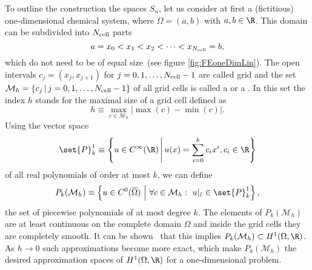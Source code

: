To outline the construction the spaces $S_n$,
let us consider at first a (fictitious) one-dimensional chemical system,
where $\Omega = (a,b)$ with $a,b \in \R$.
This domain can be subdivided into $N_\text{cell}$ parts
\[ a = x_0 < x_1 < x_2 < \cdots < x_{N_\text{cell}} = b, \]
which do not need to be of equal size~(see figure \vref{fig:FEoneDimLin}).
The open intervals $c_j = (x_j, x_{j+1})$ for $j=0, 1, \ldots, N_\text{cell}-1$
are called grid 
and the set $\mathcal{M}_h = \{c_j \, | \, j=0, 1, \ldots, N_\text{cell}-1 \}$
of all grid cells is called a  or a .
In this set the index $h$ stands for the maximal size of a grid cell
defined as
\[ h \equiv \max_{c \in \mathcal{M}_h} \big| \max(c) - \min(c) \big|. \]
Using the vector space
\[
	\set{P}_k^1 \equiv \left\{ u \in C^\infty(\R) \,\middle|\, u(x) = \sum_{i=0}^k c_i x^i, c_i \in \R \right\}
\]
of all real polynomials of order at most $k$, we can define
\begin{equation}
	P_k(\mathcal{M}_h)
	\equiv \left\{ u \in C^0(\overline{\Omega}) \ \middle| \
	\forall c \in \mathcal{M}_h: \
	u|_{\bar{c}} \in \set{P}_k^1 \right\},
	\label{eqn:PiecewisePolynomialsOne}
\end{equation}
the set of piecewise polynomials of at most degree $k$.
The elements of $P_k(\mathcal{M}_h)$
are at least continuous on the complete domain $\Omega$
and inside the grid cells they are completely smooth.
It can be shown~\cite[Lemma 4.1]{Grossmann1992} that this implies
$P_k(\mathcal{M}_h) \subset H^1(\Omega, \R)$.
As $h \to 0$ such approximations become more exact,
which make $P_k(\mathcal{M}_h)$ the desired approximation
spaces of $H^1(\Omega, \R)$ for a one-dimensional problem.

